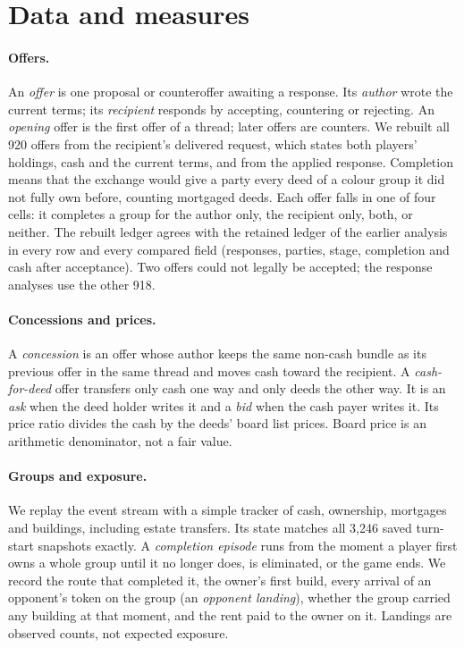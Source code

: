 \section{Data and measures}
\label{sec:measures}

\paragraph{Offers.} An \emph{offer} is one proposal or counteroffer awaiting a response. Its \emph{author} wrote the current terms; its \emph{recipient} responds by accepting, countering or rejecting. An \emph{opening} offer is the first offer of a thread; later offers are counters. We rebuilt all 920 offers from the recipient's delivered request, which states both players' holdings, cash and the current terms, and from the applied response. Completion means that the exchange would give a party every deed of a colour group it did not fully own before, counting mortgaged deeds. Each offer falls in one of four cells: it completes a group for the author only, the recipient only, both, or neither. The rebuilt ledger agrees with the retained ledger of the earlier analysis in every row and every compared field (responses, parties, stage, completion and cash after acceptance). Two offers could not legally be accepted; the response analyses use the other 918.

\paragraph{Concessions and prices.} A \emph{concession} is an offer whose author keeps the same non-cash bundle as its previous offer in the same thread and moves cash toward the recipient. A \emph{cash-for-deed} offer transfers only cash one way and only deeds the other way. It is an \emph{ask} when the deed holder writes it and a \emph{bid} when the cash payer writes it. Its price ratio divides the cash by the deeds' board list prices. Board price is an arithmetic denominator, not a fair value.

\paragraph{Groups and exposure.} We replay the event stream with a simple tracker of cash, ownership, mortgages and buildings, including estate transfers. Its state matches all 3,246 saved turn-start snapshots exactly. A \emph{completion episode} runs from the moment a player first owns a whole group until it no longer does, is eliminated, or the game ends. We record the route that completed it, the owner's first build, every arrival of an opponent's token on the group (an \emph{opponent landing}), whether the group carried any building at that moment, and the rent paid to the owner on it. Landings are observed counts, not expected exposure.

